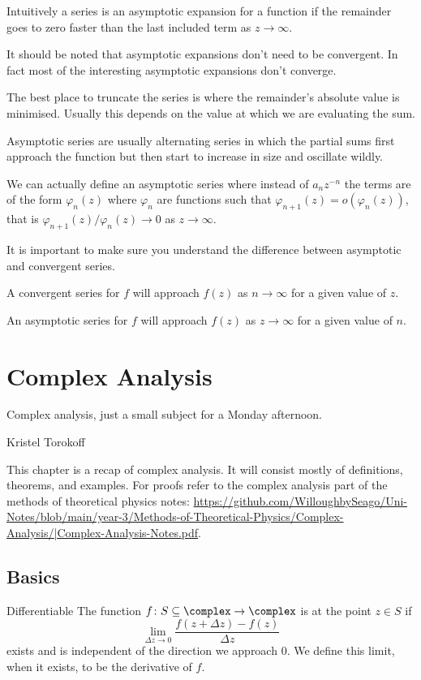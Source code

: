 \documentclass[fleqn]{NotesClass}
\begin{document}
    Intuitively a series is an asymptotic expansion for a function if the remainder goes to zero faster than the last included term as \(z \to \infty\).
    
    It should be noted that asymptotic expansions don't need to be convergent.
    In fact most of the interesting asymptotic expansions don't converge.
    
    The best place to truncate the series is where the remainder's absolute value is minimised.
    Usually this depends on the value at which we are evaluating the sum.
    
    Asymptotic series are usually alternating series in which the partial sums first approach the function but then start to increase in size and oscillate wildly.
    
    We can actually define an asymptotic series where instead of \(a_nz^{-n}\) the terms are of the form \(\varphi_n(z)\) where \(\varphi_n\) are functions such that \(\varphi_{n+1}(z) = o(\varphi_n(z))\), that is \(\varphi_{n+1}(z)/\varphi_n(z) \to 0\) as \(z \to \infty\).
    
    It is important to make sure you understand the difference between asymptotic and convergent series.
    \begin{important}
        A convergent series for \(f\) will approach \(f(z)\) as \(n \to \infty\) for a given value of \(z\).
        
        An asymptotic series for \(f\) will approach \(f(z)\) as \(z \to \infty\) for a given value of \(n\).
    \end{important}
    
    \chapter{Complex Analysis}
    \epigraph{Complex analysis, just a small subject for a Monday afternoon.}{Kristel Torokoff}
    This chapter is a recap of complex analysis.
    It will consist mostly of definitions, theorems, and examples.
    For proofs refer to the complex analysis part of the methods of theoretical physics notes: \url{https://github.com/WilloughbySeago/Uni-Notes/blob/main/year-3/Methods-of-Theoretical-Physics/Complex-Analysis/|Complex-Analysis-Notes.pdf}.
    
    \section{Basics}
    \begin{dfn}{Differentiable}{}
        The function \(f \colon S \subseteq \complex \to \complex\) is  at the point \(z \in S\) if
        \begin{equation}
            \lim_{\Delta z \to 0} \frac{f(z + \Delta z) - f(z)}{\Delta z}
        \end{equation}
        exists and is independent of the direction we approach 0.
        We define this limit, when it exists, to be the derivative of \(f\).
    \end{dfn}
    
\end{document}
